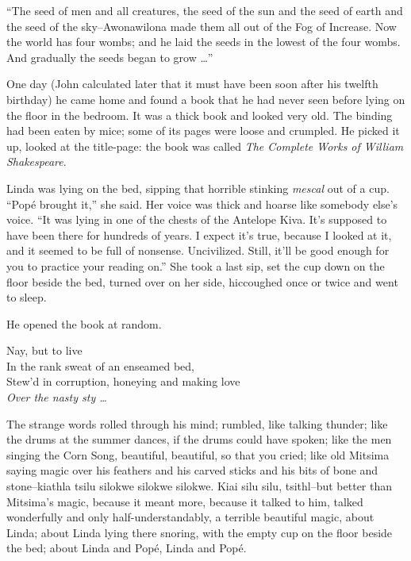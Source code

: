 \documentclass[12pt]{report}
\begin{document}
``The seed of men and all creatures, the seed of the sun and the seed of
earth and the seed of the sky--Awonawilona made them all out of the Fog
of Increase. Now the world has four wombs; and he laid the seeds in the
lowest of the four wombs. And gradually the seeds began to grow
\ldots{}''

One day (John calculated later that it must have been soon after his
twelfth birthday) he came home and found a book that he had never seen
before lying on the floor in the bedroom. It was a thick book and looked
very old. The binding had been eaten by mice; some of its pages were
loose and crumpled. He picked it up, looked at the title-page: the book
was called \emph{The Complete Works of William Shakespeare}.

Linda was lying on the bed, sipping that horrible stinking \emph{mescal}
out of a cup. ``Popé brought it,'' she said. Her voice was thick and
hoarse like somebody else's voice. ``It was lying in one of the chests
of the Antelope Kiva. It's supposed to have been there for hundreds of
years. I expect it's true, because I looked at it, and it seemed to be
full of nonsense. Uncivilized. Still, it'll be good enough for you to
practice your reading on.'' She took a last sip, set the cup down on the
floor beside the bed, turned over on her side, hiccoughed once or twice
and went to sleep.

He opened the book at random.

\emph{}

Nay, but to live\\

In the rank sweat of an enseamed bed,\\

Stew'd in corruption, honeying and making love\\

\emph{Over the nasty sty \ldots{}\\
}

The strange words rolled through his mind; rumbled, like talking
thunder; like the drums at the summer dances, if the drums could have
spoken; like the men singing the Corn Song, beautiful, beautiful, so
that you cried; like old Mitsima saying magic over his feathers and his
carved sticks and his bits of bone and stone--kiathla tsilu silokwe
silokwe silokwe. Kiai silu silu, tsithl--but better than Mitsima's
magic, because it meant more, because it talked to him, talked
wonderfully and only half-understandably, a terrible beautiful magic,
about Linda; about Linda lying there snoring, with the empty cup on the
floor beside the bed; about Linda and Popé, Linda and Popé.
\end{document}

